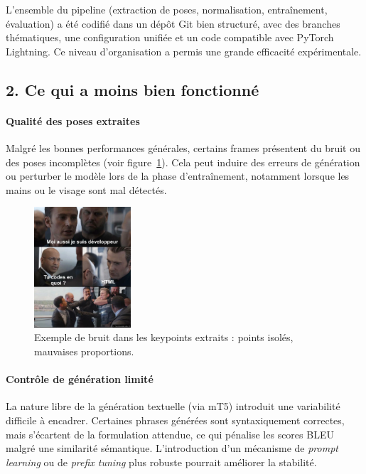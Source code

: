 L’ensemble du pipeline (extraction de poses, normalisation, entraînement, évaluation) a été codifié dans un dépôt Git bien structuré, avec des branches thématiques, une configuration unifiée et un code compatible avec PyTorch Lightning. Ce niveau d’organisation a permis une grande efficacité expérimentale.

\subsection*{2. Ce qui a moins bien fonctionné}

\paragraph{Qualité des poses extraites}

Malgré les bonnes performances générales, certains frames présentent du bruit ou des poses incomplètes (voir figure~\ref{fig:noisy_pose}). Cela peut induire des erreurs de génération ou perturber le modèle lors de la phase d’entraînement, notamment lorsque les mains ou le visage sont mal détectés.

\begin{figure}[h]
    \centering
    \includegraphics[width=0.32\textwidth]{figures/dev_joke.png}
    \caption{Exemple de bruit dans les keypoints extraits : points isolés, mauvaises proportions.}
    \label{fig:noisy_pose}
\end{figure}

\paragraph{Contrôle de génération limité}

La nature libre de la génération textuelle (via mT5) introduit une variabilité difficile à encadrer. Certaines phrases générées sont syntaxiquement correctes, mais s’écartent de la formulation attendue, ce qui pénalise les scores BLEU malgré une similarité sémantique. L’introduction d’un mécanisme de \textit{prompt learning} ou de \textit{prefix tuning} plus robuste pourrait améliorer la stabilité.

